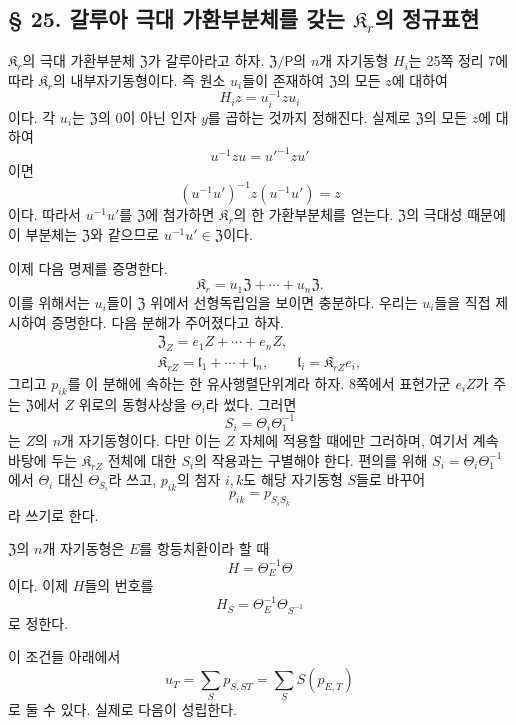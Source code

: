 \subsection*{§ 25. 갈루아 극대 가환부분체를 갖는 \(\mathfrak K_r\)의 정규표현\protect\footnotemark}

\(\mathfrak K_r\)의 극대 가환부분체 \(\mathfrak Z\)가 갈루아라고 하자. \(\mathfrak Z/\mathsf P\)의 \(n\)개 자기동형 \(H_i\)는 25쪽 정리 7에 따라 \(\mathfrak K_r\)의 내부자기동형이다. 즉 원소 \(u_i\)들이 존재하여 \(\mathfrak Z\)의 모든 \(z\)에 대하여
\[
        H_i z=u_i^{-1}zu_i
\]
이다. 각 \(u_i\)는 \(\mathfrak Z\)의 \(0\)이 아닌 인자 \(y\)를 곱하는 것까지 정해진다. 실제로 \(\mathfrak Z\)의 모든 \(z\)에 대하여
\[
        u^{-1}zu=u'^{-1}zu'
\]
이면
\[
        (u^{-1}u')^{-1}z(u^{-1}u')=z
\]
이다. 따라서 \(u^{-1}u'\)를 \(\mathfrak Z\)에 첨가하면 \(\mathfrak K_r\)의 한 가환부분체를 얻는다. \(\mathfrak Z\)의 극대성 때문에 이 부분체는 \(\mathfrak Z\)와 같으므로 \(u^{-1}u'\in\mathfrak Z\)이다.

이제 다음 명제를 증명한다.
\[
        \mathfrak K_r
        =u_1\mathfrak Z+\cdots+u_n\mathfrak Z.
\]
이를 위해서는 \(u_i\)들이 \(\mathfrak Z\) 위에서 선형독립임을 보이면 충분하다. 우리는 \(u_i\)들을 직접 제시하여 증명한다. 다음 분해가 주어졌다고 하자.
\[
\begin{gathered}
\mathfrak Z_Z=e_1Z+\cdots+e_nZ,\\
\mathfrak K_{rZ}=\mathfrak l_1+\cdots+\mathfrak l_n,
\qquad
\mathfrak l_i=\mathfrak K_{rZ}e_i,
\end{gathered}
\]
그리고 \(p_{ik}\)를 이 분해에 속하는 한 유사행렬단위계라 하자. 8쪽에서 표현가군 \(e_iZ\)가 주는 \(\mathfrak Z\)에서 \(Z\) 위로의 동형사상을 \(\Theta_i\)라 썼다. 그러면
\[
        S_i=\Theta_i\Theta_1^{-1}
\]
는 \(Z\)의 \(n\)개 자기동형이다. 다만 이는 \(Z\) 자체에 적용할 때에만 그러하며, 여기서 계속 바탕에 두는 \(\mathfrak K_{rZ}\) 전체에 대한 \(S_i\)의 작용과는 구별해야 한다. 편의를 위해 \(S_i=\Theta_i\Theta_1^{-1}\)에서 \(\Theta_i\) 대신 \(\Theta_{S_i}\)라 쓰고, \(p_{ik}\)의 첨자 \(i,k\)도 해당 자기동형 \(S\)들로 바꾸어
\[
        p_{ik}=p_{S_iS_k}
\]
라 쓰기로 한다.

\(\mathfrak Z\)의 \(n\)개 자기동형은 \(E\)를 항등치환이라 할 때
\[
        H=\Theta_E^{-1}\Theta
\]
이다. 이제 \(H\)들의 번호를
\[
        H_S=\Theta_E^{-1}\Theta_{S^{-1}}
\]
로 정한다.

이 조건들 아래에서
\[
        u_T=\sum_Sp_{S,ST}
            =\sum_SS(p_{E,T})
\]
로 둘 수 있다. 실제로 다음이 성립한다.

